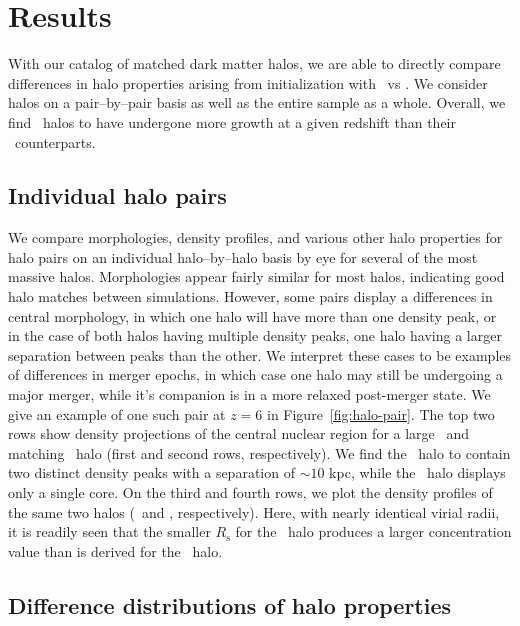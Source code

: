 \section{Results}
\label{sec:results}


With our catalog of matched dark matter halos, we are able to directly compare differences in halo properties arising from initialization with \lpt\ vs \za.  We consider halos on a pair--by--pair basis as well as the entire sample as a whole.  Overall, we find \lpt\ halos to have undergone more growth at a given redshift than their \za\ counterparts.


\subsection{Individual halo pairs}

We compare morphologies, density profiles, and various other halo properties for halo pairs on an individual halo--by--halo basis by eye for several of the most massive halos.  Morphologies appear fairly similar for most halos, indicating good halo matches between simulations.  However, some pairs display a differences in central morphology, in which one halo will have more than one density peak, or in the case of both halos having multiple density peaks, one halo having a larger separation between peaks than the other.  We interpret these cases to be examples of differences in merger epochs, in which case one halo may still be undergoing a major merger, while it's companion is in a more relaxed post-merger state.  We give an example of one such pair at $z = 6$ in Figure~\ref{fig:halo-pair}.  The top two rows show density projections of the central nuclear region for a large \lpt\ and matching \za\ halo (first and second rows, respectively).  We find  the \za\ halo to contain two distinct density peaks with a separation of $\sim 10$ kpc, while the \lpt\ halo displays only a single core.  On the third and fourth rows, we plot the density profiles of the same two halos (\lpt\ and \za, respectively).  Here, with nearly identical virial radii, it is readily seen that the smaller $R_{\mathrm{s}}$ for the \lpt\ halo produces a larger concentration value than is derived for the \za\ halo.


\subsection{Difference distributions of halo properties}

